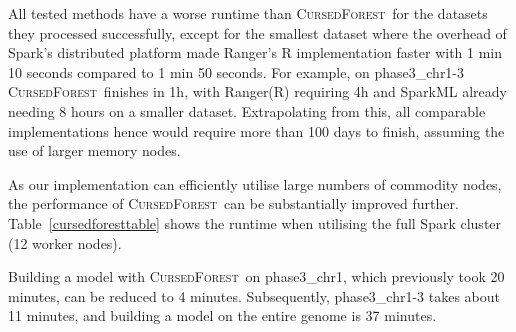 \documentclass[10pt,letterpaper]{article}
\newcommand{\cursedforest}{\textsc{CursedForest}\xspace}
\begin{document}
All tested methods have a worse runtime than \cursedforest\ for the datasets they processed successfully, except for the smallest dataset where the overhead of Spark's distributed platform made Ranger's R implementation faster with 1 min 10 seconds compared to 1 min 50 seconds. For example, on phase3\_chr1-3 \cursedforest\ finishes in 1h, with Ranger(R) requiring 4h and SparkML already needing 8 hours on a smaller dataset. 
Extrapolating from this, all comparable implementations hence would require more than 100 days to finish, assuming the use of larger memory nodes.  




As our implementation can efficiently utilise large numbers of commodity nodes, the performance of \cursedforest\ can be substantially improved further.  
Table~\ref{cursedforesttable} shows the runtime when utilising the full Spark cluster (12 worker nodes). 

Building a model with \cursedforest\ on phase3\_chr1, which previously took 20 minutes, can be reduced to 4 minutes. 
Subsequently, phase3\_chr1-3 takes about 11 minutes, and building a
model on the entire genome is 37 minutes. 
\end{document}
